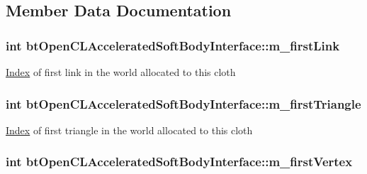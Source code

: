 \subsection{Member Data Documentation}
\hypertarget{classbt_open_c_l_accelerated_soft_body_interface_a690606a7caf85dcbf3c20d67026fc4ed}{
\subsubsection[{m\+\_\+first\+Link}]{\setlength{\rightskip}{0pt plus 5cm}int bt\+Open\+C\+L\+Accelerated\+Soft\+Body\+Interface\+::m\+\_\+first\+Link\hspace{0.3cm}{\ttfamily [protected]}}}\label{classbt_open_c_l_accelerated_soft_body_interface_a690606a7caf85dcbf3c20d67026fc4ed}
\hyperlink{struct_index}{Index} of first link in the world allocated to this cloth \hypertarget{classbt_open_c_l_accelerated_soft_body_interface_abc2c9ff04bfe0d0a9578e53ba736c309}{
\subsubsection[{m\+\_\+first\+Triangle}]{\setlength{\rightskip}{0pt plus 5cm}int bt\+Open\+C\+L\+Accelerated\+Soft\+Body\+Interface\+::m\+\_\+first\+Triangle\hspace{0.3cm}{\ttfamily [protected]}}}\label{classbt_open_c_l_accelerated_soft_body_interface_abc2c9ff04bfe0d0a9578e53ba736c309}
\hyperlink{struct_index}{Index} of first triangle in the world allocated to this cloth \hypertarget{classbt_open_c_l_accelerated_soft_body_interface_a01a8a8cb234b7f0b1b629a6d03f5f0c7}{
\subsubsection[{m\+\_\+first\+Vertex}]{\setlength{\rightskip}{0pt plus 5cm}int bt\+Open\+C\+L\+Accelerated\+Soft\+Body\+Interface\+::m\+\_\+first\+Vertex\hspace{0.3cm}{\ttfamily [protected]}}}\label{classbt_open_c_l_accelerated_soft_body_interface_a01a8a8cb234b7f0b1b629a6d03f5f0c7}
